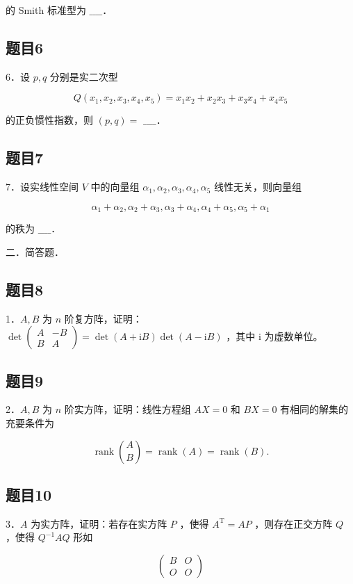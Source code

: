 \documentclass{article}
\begin{document}
的 Smith 标准型为 \(\_\_\_\_\)．

\subsection{题目6}
6．设 \(p, q\) 分别是实二次型

\[
Q\left(x_{1}, x_{2}, x_{3}, x_{4}, x_{5}\right)=x_{1} x_{2}+x_{2} x_{3}+x_{3} x_{4}+x_{4} x_{5}
\]

的正负惯性指数，则 \((p, q)=\) \(\_\_\_\_\)．

\subsection{题目7}
7．设实线性空间 \(V\) 中的向量组 \(\alpha_{1}, \alpha_{2}, \alpha_{3}, \alpha_{4}, \alpha_{5}\) 线性无关，则向量组

\[
\alpha_{1}+\alpha_{2}, \alpha_{2}+\alpha_{3}, \alpha_{3}+\alpha_{4}, \alpha_{4}+\alpha_{5}, \alpha_{5}+\alpha_{1}
\]

的秩为 \(\_\_\_\_\)．

二．简答题．\\

\subsection{题目8}
1．\(A, B\) 为 \(n\) 阶复方阵，证明： \(\operatorname{det}\left(\begin{array}{cc}A & -B \\ B & A\end{array}\right)=\operatorname{det}(A+\mathrm{i} B) \operatorname{det}(A-\mathrm{i} B)\) ，其中 i 为虚数单位。

\subsection{题目9}
2．\(A, B\) 为 \(n\) 阶实方阵，证明：线性方程组 \(A X=0\) 和 \(B X=0\) 有相同的解集的充要条件为

\[
\operatorname{rank}\binom{A}{B}=\operatorname{rank}(A)=\operatorname{rank}(B) .
\]

\subsection{题目10}
3．\(A\) 为实方阵，证明：若存在实方阵 \(P\) ，使得 \(A^{\mathrm{T}}=A P\) ，则存在正交方阵 \(Q\) ，使得 \(Q^{-1} A Q\) 形如

\[
\left(\begin{array}{ll}
B & O \\
O & O
\end{array}\right)
\]
\end{document}
